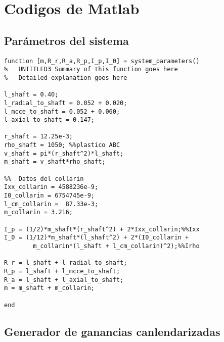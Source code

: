 \chapter{Codigos de Matlab}

\section{Par\'ametros del sistema}

\begin{lstlisting}[frame=single]
function [m,R_r,R_a,R_p,I_p,I_0] = system_parameters()
%	UNTITLED3 Summary of this function goes here
%   Detailed explanation goes here

l_shaft = 0.40;
l_radial_to_shaft = 0.052 + 0.020;
l_mcce_to_shaft = 0.052 + 0.060;
l_axial_to_shaft = 0.147;

r_shaft = 12.25e-3;
rho_shaft = 1050; %%plastico ABC
v_shaft = pi*(r_shaft^2)*l_shaft;
m_shaft = v_shaft*rho_shaft;

%%	Datos del collarin
Ixx_collarin = 4588236e-9;
I0_collarin = 6754745e-9;
l_cm_collarin =  87.33e-3;
m_collarin = 3.216;

I_p = (1/2)*m_shaft*(r_shaft^2) + 2*Ixx_collarin;%%Ixx
I_0 = (1/12)*m_shaft*(l_shaft^2) + 2*(I0_collarin + 
		m_collarin*(l_shaft + l_cm_collarin)^2);%%Irho

R_r = l_shaft + l_radial_to_shaft;
R_p = l_shaft + l_mcce_to_shaft;
R_a = l_shaft + l_axial_to_shaft;
m = m_shaft + m_collarin;

end
\end{lstlisting}


\section{Generador de ganancias canlendarizadas}

